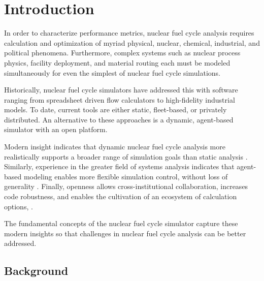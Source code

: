 
\section{Introduction}


In order to characterize performance metrics, nuclear fuel cycle analysis 
requires calculation and optimization of myriad physical, nuclear, chemical, 
industrial, and political phenomena. Furthermore, complex systems such as 
nuclear process physics, facility deployment, and material routing each 
must be modeled simultaneously for even the simplest of nuclear fuel cycle 
simulations. 


Historically, nuclear fuel cycle simulators have addressed this with software 
ranging from spreadsheet driven flow calculators to high-fidelity industrial 
models. To date, current tools are either static, fleet-based, or 
privately distributed. An alternative to these approaches is a dynamic, 
agent-based simulator with an open platform. 

Modern insight indicates that dynamic nuclear fuel cycle analysis more 
realistically supports a broader range of simulation goals than static analysis 
\cite{piet_dynamic_2011}. Similarly, experience in the greater field of systems 
analysis indicates that agent-based modeling enables more flexible simulation 
control, without loss of generality \cite{thatpapermattsent}. Finally, 
openness allows cross-institutional collaboration, increases code robustness, 
and enables the cultivation of an ecosystem of calculation options, 
\cite{softwarecarpentryresource}.  

The fundamental concepts of the \Cyclus nuclear fuel cycle simulator capture 
these modern insights so that challenges in nuclear fuel cycle analysis can be 
better addressed. 

\subsection{Background}

